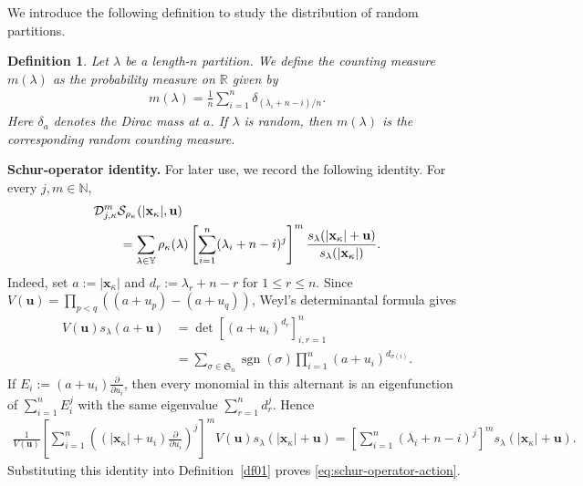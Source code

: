 \documentclass[11pt]{amsart}
\theoremstyle{plain}
\newtheorem{definition}[theorem]{Definition}
\newcommand\RR{{\mathbb R}}
\newcommand\NN{{\mathbb N}}
\newcommand\YY{{\mathbb {Y}}}
\numberwithin{equation}{section}
\numberwithin{theorem}{section}
\numberwithin{figure}{section}
\begin{document}
We introduce the following definition to study the distribution of random partitions.
\begin{definition}\label{dfcm}Let $\lambda$ be a length-$n$  partition. We define the counting measure $m(\lambda)$ as    the  probability measure on $\RR$  
  given by
\begin{eqnarray*}
m(\lambda)=\frac{1}{n}\sum_{i=1}^{n}\delta_{(\lambda_i+n-i)/n}.
\end{eqnarray*} 
Here $\delta_a$ denotes the Dirac mass at $a$.  If $\lambda$ is random, then    $m(\lambda)$ is  the corresponding random counting measure.
\end{definition}


\noindent\textbf{Schur-operator identity.}
For later use, we record the following identity. For every $j,m\in\NN$,
\begin{align}
&\mathcal{D}_{j,\kappa}^{m}
\mathcal{S}_{\rho_{\kappa}}(|\mathbf{x}_{\kappa}|,\mathbf{u})\notag\\
&\qquad=
\sum_{\lambda\in\YY}\rho_{\kappa}(\lambda)
\left[\sum_{i=1}^{n}(\lambda_i+n-i)^j\right]^m
\frac{s_{\lambda}(|\mathbf{x}_{\kappa}|+\mathbf{u})}
{s_{\lambda}(|\mathbf{x}_{\kappa}|)}.
\label{eq:schur-operator-action}
\end{align}
Indeed, set $a:=|\mathbf{x}_{\kappa}|$ and
$d_r:=\lambda_r+n-r$ for $1\leq r\leq n$. Since
$V(\mathbf{u})=\prod_{p<q}((a+u_p)-(a+u_q))$, Weyl's determinantal
formula gives
\begin{align*}
V(\mathbf{u})s_{\lambda}(a+\mathbf{u})
&=\det\!\left[(a+u_i)^{d_r}\right]_{i,r=1}^{n}\\
&=\sum_{\sigma\in\mathfrak S_n}\operatorname{sgn}(\sigma)
  \prod_{i=1}^{n}(a+u_i)^{d_{\sigma(i)}}.
\end{align*}
If $E_i:=(a+u_i)\frac{\partial}{\partial u_i}$, then every monomial in
this alternant is an eigenfunction of $\sum_{i=1}^{n}E_i^j$ with the
same eigenvalue $\sum_{r=1}^{n}d_r^j$. Hence
\begin{align*}
\frac{1}{V(\mathbf{u})}
\left[\sum_{i=1}^{n}
\left((|\mathbf{x}_{\kappa}|+u_i)
\frac{\partial}{\partial u_i}\right)^j\right]^m
V(\mathbf{u})s_{\lambda}(|\mathbf{x}_{\kappa}|+\mathbf{u})
=
\left[\sum_{i=1}^{n}(\lambda_i+n-i)^j\right]^m
s_{\lambda}(|\mathbf{x}_{\kappa}|+\mathbf{u}).
\end{align*}
Substituting this identity into Definition~\ref{df01} proves
\eqref{eq:schur-operator-action}.
\end{document}
